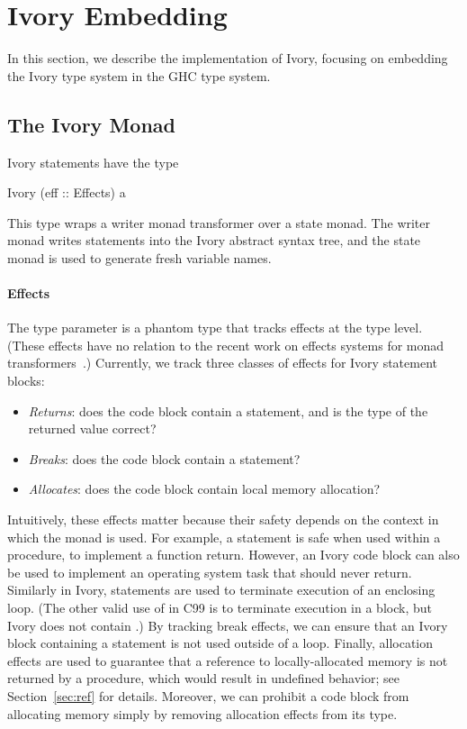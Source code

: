 \section{Ivory Embedding}
\label{sec:ivory-embedding}

In this section, we describe the implementation of Ivory, focusing on embedding
the Ivory type system in the GHC type system.

\subsection{The Ivory Monad}
\label{sec:ivory-monad}

Ivory statements have the type

\begin{code}
Ivory (eff :: Effects) a
\end{code}

\noindent
This type wraps a writer monad transformer over a state monad. The writer
monad writes statements into the Ivory abstract syntax tree, and the
state monad is used to generate fresh variable names.

\paragraph{Effects}
The  type parameter is a phantom type that tracks
effects at the type level. (These effects have no relation to
the recent work on effects systems for monad transformers~\cite{effects}.)
Currently, we track three classes of effects for Ivory statement blocks:

\begin{itemize}
\item \emph{Returns}: does the code block contain a  statement, and
  is the type of the returned value correct?
\item \emph{Breaks}: does the code block contain a  statement?
\item \emph{Allocates}: does the code block contain local memory allocation?
\end{itemize}

Intuitively, these effects matter because their safety depends on the context in
which the monad is used. For example, a  statement is safe when used
within a procedure, to implement a function return. However, an Ivory code block can
also be used to implement an operating system task that should never
return. Similarly in Ivory,  statements are used to terminate
execution of an enclosing loop. (The other valid use of  in C99 is to
terminate execution in a  block, but Ivory does not contain
.) By tracking break effects, we can ensure that an Ivory block
containing a  statement is not used outside of a loop. Finally,
allocation effects are used to guarantee that a reference to locally-allocated
memory is not returned by a procedure, which would result in undefined behavior; see
Section~\ref{sec:ref} for details. Moreover, we can prohibit a code block from
allocating memory simply by removing allocation effects from its type.

